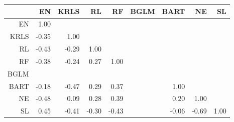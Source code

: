 \begin{table}[ht]
\centering
\begin{tabular}{rrrrrrrrr}
  \hline
 & EN & KRLS & RL & RF & BGLM & BART & NE & SL \\ 
  \hline
EN & 1.00 &  &  &  &  &  &  &  \\ 
  KRLS & -0.35 & 1.00 &  &  &  &  &  &  \\ 
  RL & -0.43 & -0.29 & 1.00 &  &  &  &  &  \\ 
  RF & -0.38 & -0.24 & 0.27 & 1.00 &  &  &  &  \\ 
  BGLM &  &  &  &  &  &  &  &  \\ 
  BART & -0.18 & -0.47 & 0.29 & 0.37 &  & 1.00 &  &  \\ 
  NE & -0.48 & 0.09 & 0.28 & 0.39 &  & 0.20 & 1.00 &  \\ 
  SL & 0.45 & -0.41 & -0.30 & -0.43 &  & -0.06 & -0.69 & 1.00 \\ 
   \hline
\end{tabular}
\end{table}
